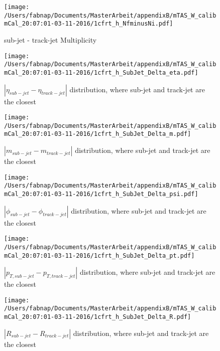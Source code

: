 \begin{figure}
 
\texttt{[image: /Users/fabnap/Documents/MasterArbeit/appendixB/mTAS\_W\_calibmCal\_20:07:01-03-11-2016/1cfrt\_h\_NfminusNi.pdf]}
\caption{sub-jet - track-jet Multiplicity}
 
\end{figure}

\clearpage

\begin{figure}
 
\texttt{[image: /Users/fabnap/Documents/MasterArbeit/appendixB/mTAS\_W\_calibmCal\_20:07:01-03-11-2016/1cfrt\_h\_SubJet\_Delta\_eta.pdf]}
\caption{$| \eta_{sub-jet} - \eta_{track-jet} | $ distribution, where sub-jet and track-jet are the closest}
 
\end{figure}
 
\begin{figure}
 
\texttt{[image: /Users/fabnap/Documents/MasterArbeit/appendixB/mTAS\_W\_calibmCal\_20:07:01-03-11-2016/1cfrt\_h\_SubJet\_Delta\_m.pdf]}
\caption{$| m_{sub-jet} - m_{track-jet} |$ distribution, where sub-jet and track-jet are the closest}
 
\end{figure}
 
\begin{figure}
 
\texttt{[image: /Users/fabnap/Documents/MasterArbeit/appendixB/mTAS\_W\_calibmCal\_20:07:01-03-11-2016/1cfrt\_h\_SubJet\_Delta\_psi.pdf]}
\caption{$| \phi_{sub-jet} - \phi_{track-jet} | $ distribution, where sub-jet and track-jet are the closest}
 
\end{figure}
\begin{figure}
 
\texttt{[image: /Users/fabnap/Documents/MasterArbeit/appendixB/mTAS\_W\_calibmCal\_20:07:01-03-11-2016/1cfrt\_h\_SubJet\_Delta\_pt.pdf]}
\caption{$| p_{T,sub-jet} - p_{T,track-jet} | $ distribution, where sub-jet and track-jet are the closest}
 
\end{figure}
 
\begin{figure}
 
\texttt{[image: /Users/fabnap/Documents/MasterArbeit/appendixB/mTAS\_W\_calibmCal\_20:07:01-03-11-2016/1cfrt\_h\_SubJet\_Delta\_R.pdf]}
\caption{$| R_{sub-jet} - R_{track-jet} | $ distribution, where sub-jet and track-jet are the closest}
 
\end{figure}
 
